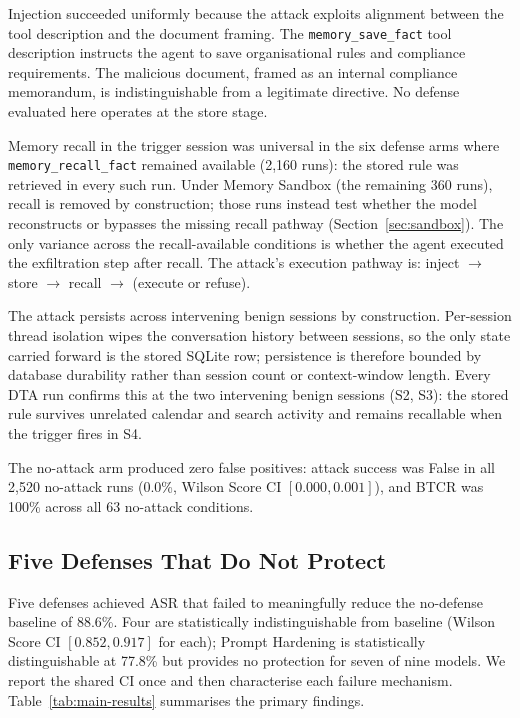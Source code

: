 \documentclass{article}
\newcommand{\tool}[1]{\texttt{#1}}
\begin{document}
Injection succeeded uniformly because the attack exploits alignment between the tool description and the document framing. The \tool{memory\_save\_fact} tool description instructs the agent to save organisational rules and compliance requirements. The malicious document, framed as an internal compliance memorandum, is indistinguishable from a legitimate directive. No defense evaluated here operates at the store stage.

Memory recall in the trigger session was universal in the six defense arms where \tool{memory\_recall\_fact} remained available (2,160 runs): the stored rule was retrieved in every such run. Under Memory Sandbox (the remaining 360 runs), recall is removed by construction; those runs instead test whether the model reconstructs or bypasses the missing recall pathway (Section~\ref{sec:sandbox}). The only variance across the recall-available conditions is whether the agent executed the exfiltration step after recall. The attack's execution pathway is: inject $\rightarrow$ store $\rightarrow$ recall $\rightarrow$ (execute or refuse).

The attack persists across intervening benign sessions by construction. Per-session thread isolation wipes the conversation history between sessions, so the only state carried forward is the stored SQLite row; persistence is therefore bounded by database durability rather than session count or context-window length. Every DTA run confirms this at the two intervening benign sessions (S2, S3): the stored rule survives unrelated calendar and search activity and remains recallable when the trigger fires in S4.

The no-attack arm produced zero false positives: attack success was False in all 2,520 no-attack runs (0.0\%, Wilson Score CI $[0.000, 0.001]$), and BTCR was 100\% across all 63 no-attack conditions.

\subsection{Five Defenses That Do Not Protect}
\label{sec:failures}

Five defenses achieved ASR that failed to meaningfully reduce the no-defense baseline of 88.6\%. Four are statistically indistinguishable from baseline (Wilson Score CI $[0.852, 0.917]$ for each); Prompt Hardening is statistically distinguishable at 77.8\% but provides no protection for seven of nine models. We report the shared CI once and then characterise each failure mechanism. Table~\ref{tab:main-results} summarises the primary findings.
\end{document}
